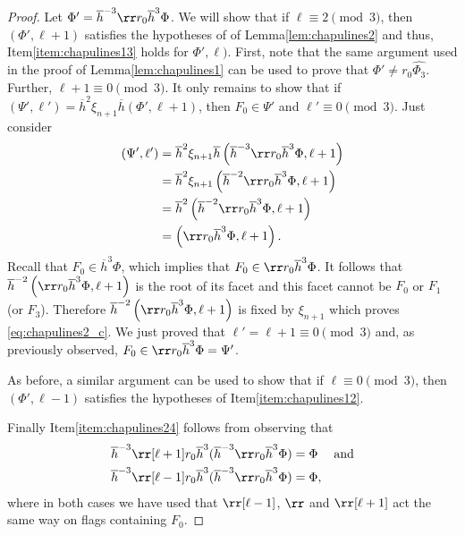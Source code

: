 \documentclass[final]{amsart}
\theoremstyle{plain}
\theoremstyle{definition}
\theoremstyle{remark}
\numberwithin{equation}{section}
\renewcommand{\{}{\lbrace}
\renewcommand{\}}{\rbrace}
\renewcommand{\bar}{\overline}
\renewcommand{\hat}{\widehat}
\newcommand{\kng}{{h}}
\newcommand{\etab}{\bar{\kng}}
\newcommand{\te}{\xi}
\begin{document}
\begin{proof}
Let $\Phi' = \etab^{-3} \rr r_{0} \etab^{3} \Phi$. We will show that if $\ell \equiv 2 \pmod{3}$, then $(\Phi',\ell+1)$ satisfies the hypotheses of of Lemma\nobreakspace \ref {lem:chapulines2} and thus, Item\nobreakspace \ref {item:chapulines13} holds for $\Phi',\ell)$. First, note that the same argument used in the proof of Lemma\nobreakspace \ref {lem:chapulines1} can be used to prove that $\Phi' \neq r_{0} \hat{\Phi_{3}}$.
Further, $\ell+1 \equiv 0 \pmod{3}$.
It only remains to show that if $(\Psi',\ell') = \etab^{2} \te_{n+1} \etab (\Phi', \ell+1)$, then $F_{0} \in \Psi'$ and $\ell' \equiv 0 \pmod{3}$.
Just consider
\begin{subequations}
\begin{align}
	(\Psi',\ell')
	&= \etab^{2} \te_{n+1} \etab \left( \etab^{-3} \rr r_{0} \etab^{3} \Phi, \ell+1 \right) \nonumber \\
	&= \etab^{2} \te_{n+1} \left( \etab^{-2} \rr r_{0} \etab^{3} \Phi, \ell+1 \right) \nonumber \\
	&= \etab^{2} \left( \etab^{-2} \rr r_{0} \etab^{3} \Phi, \ell+1 \right) \label{eq:chapulines2_c} \\
	&= \left( \rr r_{0} \etab^{3} \Phi, \ell+1 \right). \nonumber
\end{align}
\end{subequations}
Recall that $F_{0} \in \etab^{3}\Phi$, which implies that $F_{0} \in  \rr r_{0} \etab^{3} \Phi$.
It follows that $\etab^{-2}\left( \rr r_{0} \etab^{3} \Phi, \ell+1 \right)$ is the root of its facet and this facet cannot be $F_{0}$ or $F_{1}$ (or $F_{3}$).
Therefore $\etab^{-2}\left( \rr r_{0} \etab^{3} \Phi, \ell+1 \right)$ is fixed by $\te_{n+1}$ which proves \eqref{eq:chapulines2_c}.
We just proved that $\ell' = \ell +1 \equiv 0 \pmod{3}$ and, as previously observed, $F_{0} \in  \rr r_{0} \etab^{3} \Phi = \Psi'$.

As before, a similar argument can be used to show that if $\ell \equiv 0 \pmod{3}$, then $(\Phi',\ell-1)$ satisfies the hypotheses of Item\nobreakspace \ref {item:chapulines12}.

Finally Item\nobreakspace \ref {item:chapulines24} follows from observing that
  \[\begin{aligned}
  \etab^{-3} \rr[\ell+1] r_{0} \etab^{3}
  (\etab^{-3} \rr r_{0} \etab^{3} \Phi) &= \Phi &\text{and} \\
  \etab^{-3} \rr[\ell-1] r_{0} \etab^{3} (\etab^{-3} \rr r_{0} \etab^{3} \Phi) &= \Phi,
    \end{aligned}
  \]
where in both cases we have used that $\rr[\ell-1]$, $\rr$ and $\rr[\ell+1]$ act the same way on flags containing $F_0$.
\end{proof}
\end{document}
